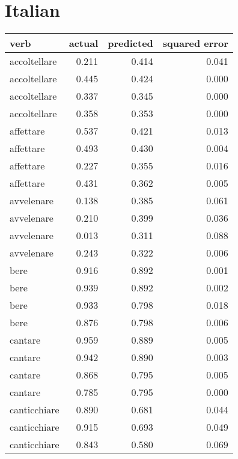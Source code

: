 \section{Italian}

\begin{longtable}{l|rrr}
\textbf{verb} & \textbf{actual} & \textbf{predicted} & \textbf{squared error} \\
\hline
\endhead
accoltellare   & 0.211  & 0.414     & 0.041         \\
accoltellare   & 0.445  & 0.424     & 0.000           \\
accoltellare   & 0.337  & 0.345     & 0.000           \\
accoltellare   & 0.358  & 0.353     & 0.000           \\
affettare      & 0.537  & 0.421     & 0.013         \\
affettare      & 0.493  & 0.430      & 0.004         \\
affettare      & 0.227  & 0.355     & 0.016         \\
affettare      & 0.431  & 0.362     & 0.005         \\
avvelenare     & 0.138  & 0.385     & 0.061         \\
avvelenare     & 0.210   & 0.399     & 0.036         \\
avvelenare     & 0.013  & 0.311     & 0.088         \\
avvelenare     & 0.243  & 0.322     & 0.006         \\
bere           & 0.916  & 0.892     & 0.001         \\
bere           & 0.939  & 0.892     & 0.002         \\
bere           & 0.933  & 0.798     & 0.018         \\
bere           & 0.876  & 0.798     & 0.006         \\
cantare        & 0.959  & 0.889     & 0.005         \\
cantare        & 0.942  & 0.890      & 0.003         \\
cantare        & 0.868  & 0.795     & 0.005         \\
cantare        & 0.785  & 0.795     & 0.000             \\
canticchiare   & 0.890   & 0.681     & 0.044         \\
canticchiare   & 0.915  & 0.693     & 0.049         \\
canticchiare   & 0.843  & 0.580      & 0.069         \\

\end{longtable}
